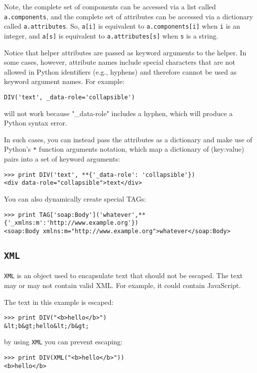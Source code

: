 \documentclass[justified,sixbynine,notoc]{tufte-book}
\def\ft{\small\tt}
\def\inxx#1{\index{#1}}
\begin{document}
\begin{fullwidth}
Note, the complete set of components can be accessed via a list called {\ft a.components}, and the complete set of attributes can be accessed via a dictionary called {\ft a.attributes}. So, {\ft a[i]} is equivalent to {\ft a.components[i]} when {\ft i} is an integer, and {\ft a[s]} is equivalent to {\ft a.attributes[s]} when {\ft s} is a string.

Notice that helper attributes are passed as keyword arguments to the helper. In some cases, however, attribute names include special characters that are not allowed in Python identifiers (e.g., hyphens) and therefore cannot be used as keyword argument names. For example:

\begin{lstlisting}
DIV('text', _data-role='collapsible')
\end{lstlisting}
\noindent will not work because "\_data-role" includes a hyphen, which will produce a Python syntax error.

In such cases, you can instead pass the attributes as a dictionary and make use of Python's {\ft **} function arguments notation, which map a dictionary of (key:value) pairs into a set of keyword arguments:

\begin{lstlisting}
>>> print DIV('text', **{'_data-role': 'collapsible'})
<div data-role="collapsible">text</div>
\end{lstlisting}

You can also dynamically create special TAGs:

\begin{lstlisting}
>>> print TAG['soap:Body']('whatever',**{'_xmlns:m':'http://www.example.org'})
<soap:Body xmlns:m="http://www.example.org">whatever</soap:Body>
\end{lstlisting}

\goodbreak\subsection{{\ft XML}}

\inxx{XML}
{\ft XML} is an object used to encapsulate text that should not be escaped. The text may or may not contain valid XML. For example, it could contain JavaScript.

The text in this example is escaped:
\begin{lstlisting}
>>> print DIV("<b>hello</b>")
&lt;b&gt;hello&lt;/b&gt;
\end{lstlisting}
\noindent by using {\ft XML} you can prevent escaping:
\begin{lstlisting}
>>> print DIV(XML("<b>hello</b>"))
<b>hello</b>
\end{lstlisting}


\end{fullwidth}
\end{document}
